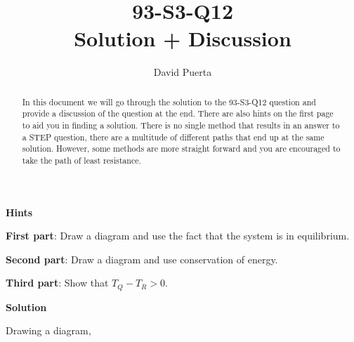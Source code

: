 \documentclass{article}
\title{93-S3-Q12 \\ Solution + Discussion}
\author{David Puerta}
\date{}
\begin{document}
\maketitle

\begin{abstract}
    \noindent In this document we will go through the solution to the 93-S3-Q12 question and provide a discussion of the question at the end. There are also hints on the first page to aid you in finding a solution. There is no single method that results in an answer to a STEP question, there are a multitude of different paths that end up at the same solution. However, some methods are more straight forward and you are encouraged to take the path of least resistance.  
\end{abstract}

\vspace{1cm}

\begin{center}
    \textbf{Hints}
\end{center}

\textbf{First part}: Draw a diagram and use the fact that the system is in equilibrium.

\vspace{1cm}

\textbf{Second part}: Draw a diagram and use conservation of energy.

\vspace{1cm}

\textbf{Third part}: Show that $T_Q - T_R >0$.



\newpage

\begin{center}
    \textbf{Solution}
\end{center}

\vspace{0.5cm}

Drawing a diagram,
\end{document}
